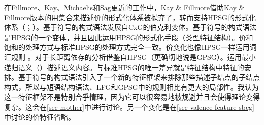 在Fillmore、Kay、Michaelis和Sag更近的工作中，Kay \& Fillmore借助Kay \& Fillmore版本的用集合来描述价的形式化体系被抛弃了，转而支持HPSG的形式化体系（\citealp{Kay2005a,Michaelis2006a,Sag2012a}；\citealp*[--11]{SBK2012a}）。基于符号的构式语法发展自CxG的伯克利变体。基于符号的构式语法是HPSG的一个变体\citep[]{Sag2010b}，并且因此运用HPSG的形式化手段（类型特征结构）。价和饱和的处理方式与标准HPSG的处理方式完全一致。价变化也像HPSG一样运用词汇规则 \citep*[\S~2.3]{SBK2012a}。对于长距离依存的分析借鉴自HPSG（更确切地说是GPSG\indexgpsgc）。运用最小递归语义\indexmrs（\citealp*{CFPS2005a}）描述语义内容。与标准HPSG的唯一差异就是特征结构中特征的安排。基于符号的构式语法引入了一个新的特征框架来排除那些描述子结点的子结点构式，所以与短语结构语法、LFG和GPSG中的规则相比有更大的局部性。我认为这一特征框架不是特别合乎情理，因为它可以很容易地被规避并且会使得理论变得复杂。这会在\ref{sec-mother}中进行讨论。另一个变化是在\ref{sec-valence-feature-sbcg}中讨论的价特征省略。

